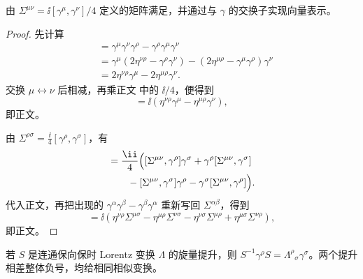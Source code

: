 \begin{proposition}
由 $\Sigma^{\mu\nu}=\ii[\gamma^\mu,\gamma^\nu]/4$ 定义的矩阵满足，并通过与 $\gamma$ 的交换子实现向量表示。
\end{proposition}

\begin{proof}
先计算
\begin{align*}
 [\gamma^\mu\gamma^\nu,\gamma^\rho]
 &=\gamma^\mu\gamma^\nu\gamma^\rho
 -\gamma^\rho\gamma^\mu\gamma^\nu\\
 &=\gamma^\mu(2\eta^{\nu\rho}-\gamma^\rho\gamma^\nu)
 -(2\eta^{\mu\rho}-\gamma^\mu\gamma^\rho)\gamma^\nu\\
 &=2\eta^{\nu\rho}\gamma^\mu-2\eta^{\mu\rho}\gamma^\nu.
\end{align*}
交换 $\mu\leftrightarrow\nu$ 后相减，再乘正文 中的 $\ii/4$，便得到
\begin{equation*}
 [\Sigma^{\mu\nu},\gamma^\rho]
 =\ii(\eta^{\nu\rho}\gamma^\mu-\eta^{\mu\rho}\gamma^\nu),
\end{equation*}
即正文。

由 $\Sigma^{\rho\sigma}=\frac{\ii}{4}[\gamma^\rho,\gamma^\sigma]$，有
\begin{align*}
 [\Sigma^{\mu\nu},\Sigma^{\rho\sigma}]
 &=\frac{\ii}{4}\Bigl(
 [\Sigma^{\mu\nu},\gamma^\rho]\gamma^\sigma
 +\gamma^\rho[\Sigma^{\mu\nu},\gamma^\sigma]\\
 &\qquad-[\Sigma^{\mu\nu},\gamma^\sigma]\gamma^\rho
 -\gamma^\sigma[\Sigma^{\mu\nu},\gamma^\rho]\Bigr).
\end{align*}
代入正文，再把出现的 $\gamma^\alpha\gamma^\beta-\gamma^\beta\gamma^\alpha$ 重新写回 $\Sigma^{\alpha\beta}$，得到
\begin{equation*}
 [\Sigma^{\mu\nu},\Sigma^{\rho\sigma}]
 =\ii\left(
 \eta^{\nu\rho}\Sigma^{\mu\sigma}
 -\eta^{\mu\rho}\Sigma^{\nu\sigma}
 -\eta^{\nu\sigma}\Sigma^{\mu\rho}
 +\eta^{\mu\sigma}\Sigma^{\nu\rho}
 \right),
\end{equation*}
即正文。
\end{proof}

\begin{proposition}
若 $S$ 是连通保向保时 Lorentz 变换 $\Lambda$ 的旋量提升，则 $S^{-1}\gamma^\rho S=\Lambda^\rho{}_\sigma\gamma^\sigma$。两个提升相差整体负号，均给相同相似变换。
\end{proposition}

